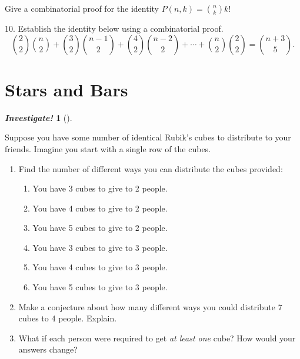 \documentclass[10pt,]{book}
\theoremstyle{plain}
\theoremstyle{definition}
\theoremstyle{definition}
\newtheorem{investigation}[project]{\emph{Investigate!}}
\theoremstyle{definition}
\numberwithin{equation}{chapter}
\begin{document}
\begin{exerciselist}
          Give a combinatorial proof for the identity \(P(n,k) = {n \choose k}k!\)
\par\smallskip
\item[10.]\hypertarget{exercise-81}{}
          Establish the identity below using a combinatorial proof.
          \begin{equation*}
            {2 \choose 2}{n \choose 2} + {3 \choose 2}{n-1 \choose 2} + {4\choose 2}{n-2 \choose 2} + \cdots + {n\choose 2}{2\choose 2} = {n+3 \choose 5}.
          \end{equation*}
\par\smallskip
\end{exerciselist}
\typeout{************************************************}
\typeout{************************************************}
\section[Stars and Bars]{Stars and Bars}\label{sec_stars-and-bars}

%
\begin{investigation}[]\label{investigation-10}

  Suppose you have some number of identical Rubik's cubes to distribute to your friends. Imagine you start with a single row of the cubes.


\leavevmode%
\begin{enumerate}
\item\hypertarget{li-557}{}
 Find the number of different ways you can distribute the cubes provided:
%
%
\begin{enumerate}
\item\hypertarget{li-558}{}
You have 3 cubes to give to 2 people.
%
\item\hypertarget{li-559}{}
You have 4 cubes to give to 2 people.
%
\item\hypertarget{li-560}{}
You have 5 cubes to give to 2 people.
%
\item\hypertarget{li-561}{}
You have 3 cubes to give to 3 people.
%
\item\hypertarget{li-562}{}
You have 4 cubes to give to 3 people.
%
\item\hypertarget{li-563}{}
You have 5 cubes to give to 3 people.
%
\end{enumerate}
\item\hypertarget{li-564}{}
Make a conjecture about how many different ways you could distribute 7 cubes to 4 people. Explain.
%
\item\hypertarget{li-565}{}
What if each person were required to get \emph{at least one} cube? How would your answers change?
%
\end{enumerate}

%
\end{investigation}
\par
\end{document}
